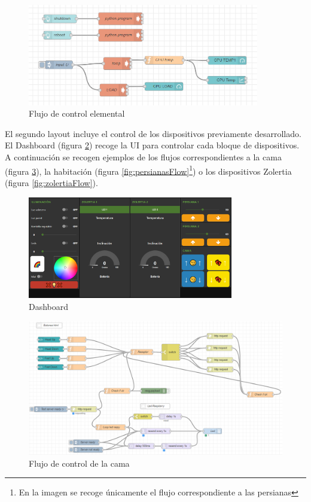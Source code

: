 \begin{figure}[tb]
\centering
\includegraphics[width=0.9\textwidth]{figuras/infoRaspyFlow.png}
\caption{Flujo de control elemental}
\label{fig:infoRaspyFlow}
\end{figure}

El segundo layout incluye el control de los dispositivos previamente desarrollado. El Dashboard (figura \ref{fig:Dashboard}) recoge la UI para controlar cada bloque de dispositivos. A continuación se recogen ejemplos de los flujos correspondientes a la cama (figura \ref{fig:camaFlow}), la habitación (figura \ref{fig:persianasFlow}\footnote{En la imagen se recoge únicamente el flujo correspondiente a las persianas}) o los dispositivos Zolertia (figura \ref{fig:zolertiaFlow}).

\begin{figure}[tb]
\centering
\includegraphics[width=0.8\textwidth]{figuras/Dashboard.png}
\caption{Dashboard}
\label{fig:Dashboard}
\end{figure}

\begin{figure}[H]
\centering
\includegraphics[width=1\textwidth]{figuras/camaFlow.png}
\caption{Flujo de control de la cama}
\label{fig:camaFlow}
\end{figure}

